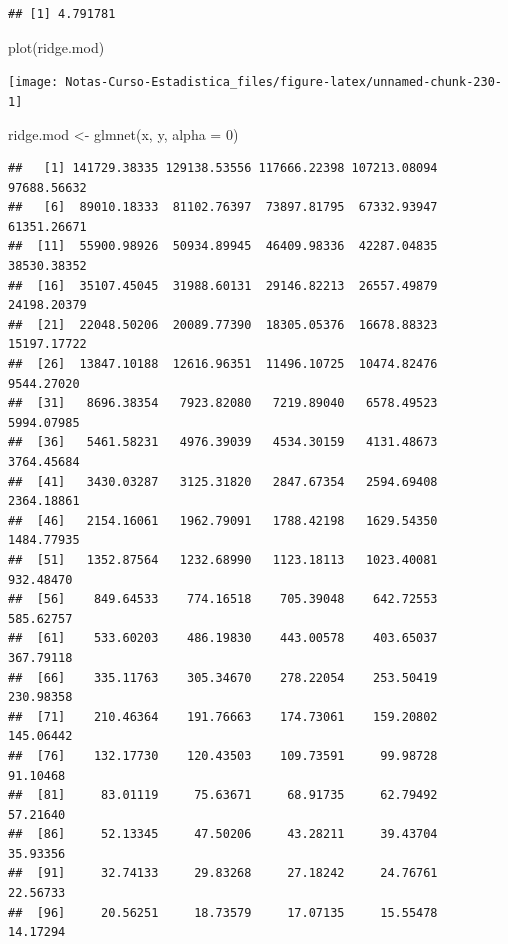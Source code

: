 \documentclass[
  12pt,
]{book}
\newenvironment{Shaded}{\begin{snugshade}}{\end{snugshade}}
\newcommand{\AttributeTok}[1]{\textcolor[rgb]{0.77,0.63,0.00}{#1}}
\newcommand{\DecValTok}[1]{\textcolor[rgb]{0.00,0.00,0.81}{#1}}
\newcommand{\FunctionTok}[1]{\textcolor[rgb]{0.00,0.00,0.00}{#1}}
\newcommand{\NormalTok}[1]{#1}
\newcommand{\OtherTok}[1]{\textcolor[rgb]{0.56,0.35,0.01}{#1}}
\newcommand{\SpecialCharTok}[1]{\textcolor[rgb]{0.00,0.00,0.00}{#1}}
\theoremstyle{definition}
\theoremstyle{definition}
\theoremstyle{definition}
\theoremstyle{definition}
\theoremstyle{remark}
\begin{document}
\begin{verbatim}
## [1] 4.791781
\end{verbatim}

\begin{Shaded}
\begin{Highlighting}[]
\FunctionTok{plot}\NormalTok{(ridge.mod)}
\end{Highlighting}
\end{Shaded}

\begin{center}\texttt{[image: Notas-Curso-Estadistica\_files/figure-latex/unnamed-chunk-230-1]} \end{center}

\begin{Shaded}
\begin{Highlighting}[]
\NormalTok{ridge.mod }\OtherTok{\textless{}{-}} \FunctionTok{glmnet}\NormalTok{(x, y, }\AttributeTok{alpha =} \DecValTok{0}\NormalTok{)}
\end{Highlighting}
\end{Shaded}

\begin{Shaded}
\end{Shaded}

\begin{verbatim}
##   [1] 141729.38335 129138.53556 117666.22398 107213.08094  97688.56632
##   [6]  89010.18333  81102.76397  73897.81795  67332.93947  61351.26671
##  [11]  55900.98926  50934.89945  46409.98336  42287.04835  38530.38352
##  [16]  35107.45045  31988.60131  29146.82213  26557.49879  24198.20379
##  [21]  22048.50206  20089.77390  18305.05376  16678.88323  15197.17722
##  [26]  13847.10188  12616.96351  11496.10725  10474.82476   9544.27020
##  [31]   8696.38354   7923.82080   7219.89040   6578.49523   5994.07985
##  [36]   5461.58231   4976.39039   4534.30159   4131.48673   3764.45684
##  [41]   3430.03287   3125.31820   2847.67354   2594.69408   2364.18861
##  [46]   2154.16061   1962.79091   1788.42198   1629.54350   1484.77935
##  [51]   1352.87564   1232.68990   1123.18113   1023.40081    932.48470
##  [56]    849.64533    774.16518    705.39048    642.72553    585.62757
##  [61]    533.60203    486.19830    443.00578    403.65037    367.79118
##  [66]    335.11763    305.34670    278.22054    253.50419    230.98358
##  [71]    210.46364    191.76663    174.73061    159.20802    145.06442
##  [76]    132.17730    120.43503    109.73591     99.98728     91.10468
##  [81]     83.01119     75.63671     68.91735     62.79492     57.21640
##  [86]     52.13345     47.50206     43.28211     39.43704     35.93356
##  [91]     32.74133     29.83268     27.18242     24.76761     22.56733
##  [96]     20.56251     18.73579     17.07135     15.55478     14.17294
\end{verbatim}
\end{document}
